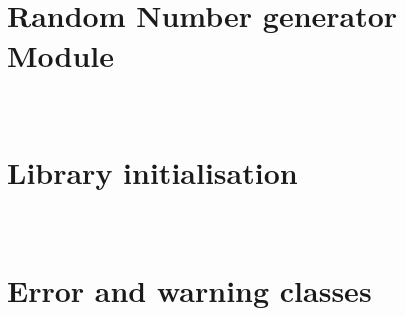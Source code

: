 \documentclass{manual}
\begin{document}
\chapter[\protect\module{pygsl.rng} --- Random Number generator
Module]{\protect{} \\ Random Number generator Module}
\label{cha:rng-module}


\chapter[\protect\module{pygsl.init} --- Library
initialisation]{\protect{} \\ Library initialisation}
\label{cha:library-initialisation}


\chapter[\protect\module{pygsl.errors} --- Error and warning
classes]{\protect{} \\ Error and warning classes} 
\label{cha:error-module}



\end{document}
